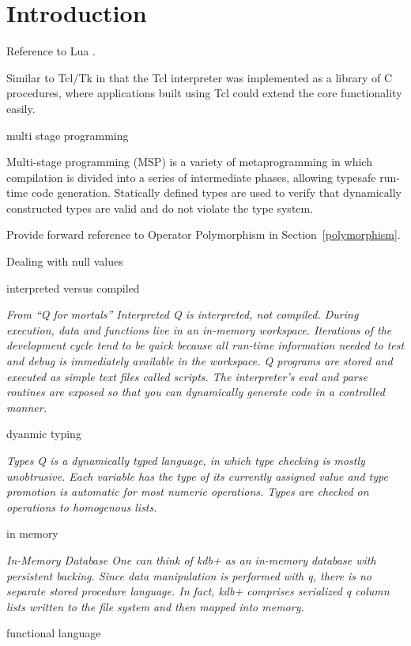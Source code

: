 
\section{Introduction}

\be
\item 
Reference to Lua \cite{Lua2011}.

Similar to Tcl/Tk \cite{Ousterhout2009} in that the Tcl interpreter 
was implemented as a library of C procedures, where applications 
built using Tcl could extend the core functionality easily.

\item multi stage programming

Multi-stage programming (MSP) is a variety of metaprogramming in which
compilation is divided into a series of intermediate phases, allowing typesafe
run-time code generation. Statically defined types are used to verify that
dynamically constructed types are valid and do not violate the type system.

Provide forward reference to Operator Polymorphism in
Section~\ref{polymorphism}.

\item 

Dealing with null values 

\item interpreted versus compiled

{\em  From ``Q for mortals''
  Interpreted Q is interpreted, not compiled. During execution, data and
  functions live in an in-memory workspace. Iterations of the development cycle
  tend to be quick because all run-time information needed to test and debug is
  immediately available in the workspace. Q programs are stored and executed as
  simple text files called scripts. The interpreter's eval and parse routines
  are exposed so that you can dynamically generate code in a controlled manner.

}
\item dyanmic typing

  {\em 
  Types Q is a dynamically typed language, in which type checking is mostly
  unobtrusive. Each variable has the type of its currently assigned value and
  type promotion is automatic for most numeric operations. Types are checked on
  operations to homogenous lists.
}

\item in memory

  {\em 
  In-Memory Database One can think of kdb+ as an in-memory database with
  persistent backing. Since data manipulation is performed with q, there is no
  separate stored procedure language. In fact, kdb+ comprises serialized q
  column lists written to the file system and then mapped into memory.
}

\item functional language 
\ee
